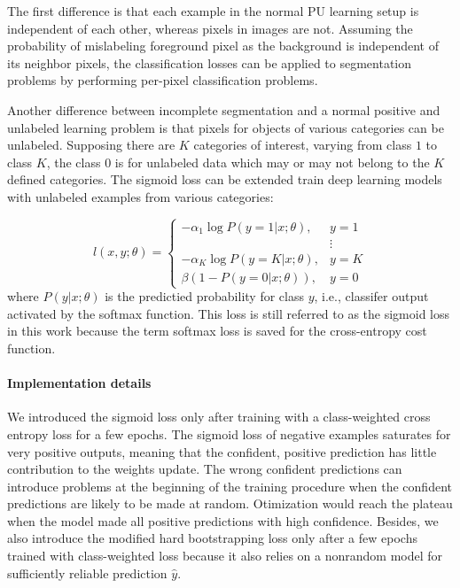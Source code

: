 The first difference is that each example in the normal PU learning setup is independent of each other, whereas pixels in images are not.
Assuming the probability of mislabeling foreground pixel as the background is independent of its neighbor pixels, the classification losses can be applied to segmentation problems by performing per-pixel classification problems.

Another difference between incomplete segmentation and a normal positive and unlabeled learning problem is that pixels for objects of various categories can be unlabeled.
Supposing there are $K$ categories of interest, varying from class $1$ to class $K$, the class $0$ is for unlabeled data which may or may not belong to the $K$ defined categories.
The sigmoid loss can be extended train deep learning models with unlabeled examples from various categories:

\[
  l(x, y; \theta) =
    \begin{cases}
      - \alpha_1 \log P(y=1 \vert x; \theta), & y = 1 \\
                                              & \vdots \\
      - \alpha_K \log P(y=K \vert x; \theta), & y = K \\
      \beta (1 - P(y=0 \vert x; \theta)), & y = 0
    \end{cases}
\]
where $P(y \vert x; \theta)$ is the predictied probability for class $y$, i.e., classifer output activated by the softmax function.
This loss is still referred to as the sigmoid loss in this work because the term softmax loss is saved for the cross-entropy cost function.


\paragraph{Implementation details}
We introduced the sigmoid loss only after training with a class-weighted cross entropy loss for a few epochs.
The sigmoid loss of negative examples saturates for very positive outputs, meaning that the confident, positive prediction has little contribution to the weights update.
The wrong confident predictions can introduce problems at the beginning of the training procedure when the confident predictions are likely to be made at random.
Otimization would reach the plateau when the model made all positive predictions with high confidence.
Besides, we also introduce the modified hard bootstrapping loss only after a few epochs trained with class-weighted loss because it also relies on a nonrandom model for sufficiently reliable prediction $\hat{y}$.


